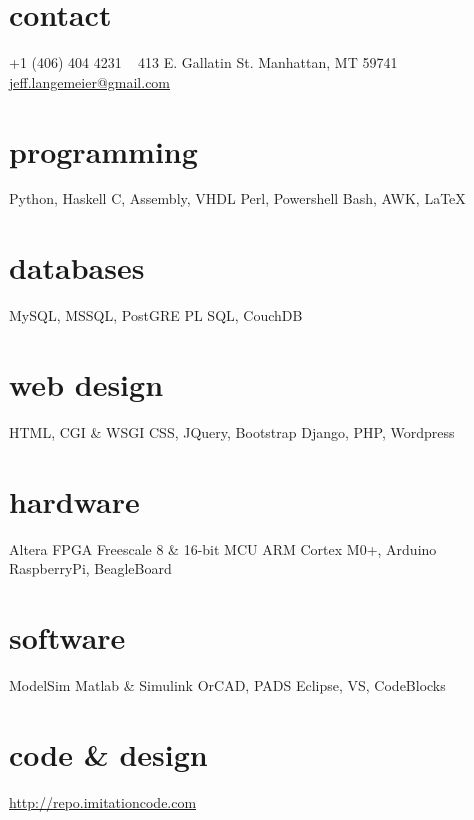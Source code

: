 \documentclass[]{two-column-stats} %
\begin{document}


\begin{aside} %
  \section{contact}
  +1 (406) 404 4231
  ~
  413 E. Gallatin St.
  Manhattan, MT 59741
  ~
  \href{mailto:jeff.langemeier@gmail.com}{jeff.langemeier@gmail.com}
  \section{programming}
  Python, Haskell
  C, Assembly, VHDL
  Perl, Powershell
  Bash, AWK, \LaTeX
  \section{databases}
  MySQL, MSSQL, PostGRE
  PL SQL, CouchDB
  \section{web design}
  HTML, CGI \& WSGI
  CSS, JQuery, Bootstrap
  Django, PHP, Wordpress
  \section{hardware}
  Altera FPGA
  Freescale 8 \& 16-bit MCU
  ARM Cortex M0+,  Arduino
  RaspberryPi, BeagleBoard
  \section{software}
  ModelSim
  Matlab \& Simulink
  OrCAD, PADS
  Eclipse, VS, CodeBlocks
  \section{code \& design}
  \href{https://bitbucket.org/jlangemeier/}{http://repo.imitationcode.com}
\end{aside}
\end{document}

